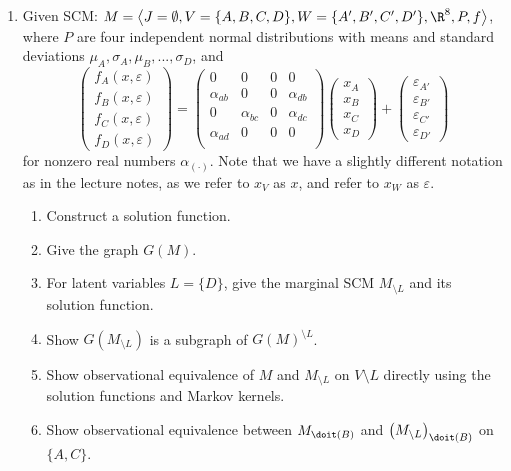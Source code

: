 \begin{enumerate}
  \item %
  Given SCM: $M = \left\langle J=\emptyset, V=\{A, B, C, D\}, W=\{A', B', C', D'\}, \R^8, P, f \right\rangle$, where $P$ are four independent normal distributions with means and standard deviations $\mu_A, \sigma_A, \mu_B, ..., \sigma_D$, and
  \[
    \begin{pmatrix}
      f_A(x, \varepsilon) \\ f_B(x, \varepsilon) \\ f_C(x, \varepsilon) \\ f_D(x, \varepsilon)
    \end{pmatrix}
    =
    \begin{pmatrix}
      0           & 0           & 0 & 0           \\
      \alpha_{ab} & 0           & 0 & \alpha_{db} \\
      0           & \alpha_{bc} & 0 & \alpha_{dc} \\
      \alpha_{ad} & 0           & 0 & 0           \\
    \end{pmatrix}
    \begin{pmatrix}
      x_A \\ x_B \\ x_C \\ x_D
    \end{pmatrix}
    +
    \begin{pmatrix}
      \varepsilon_{A'} \\ \varepsilon_{B'} \\ \varepsilon_{C'} \\ \varepsilon_{D'}
    \end{pmatrix}
  \]
  for nonzero real numbers $\alpha_{(\cdot)}$. Note that we have a slightly different notation as in the lecture notes, as we refer to $x_V$ as $x$, and refer to $x_W$ as $\varepsilon$.
  \begin{enumerate}
    \item Construct a solution function.
    \item Give the graph $G(M)$.
    \item For latent variables $L=\{D\}$, give the marginal SCM $M_{\setminus L}$ and its solution function.
    \item Show $G(M_{\setminus L})$ is a subgraph of $G(M)^{\setminus L}$.
    \item Show observational equivalence of $M$ and $M_{\setminus L}$ on $V \setminus L$ directly using the solution functions and Markov kernels.
    \item Show observational equivalence between $M_{\doit(B)}$ and ${\left(M_{\setminus L}\right)}_{\doit(B)}$ on $\{A,C\}$.
  \end{enumerate}


\end{enumerate}
